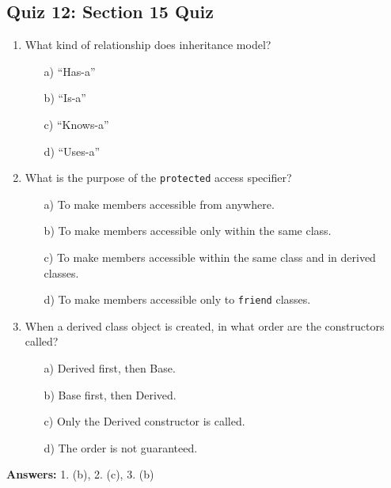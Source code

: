 \subsection{Quiz 12: Section 15 Quiz}
\begin{enumerate}
	\item What kind of relationship does inheritance model?
	\begin{enumerate}
		\item[a)] ``Has-a''
		\item[b)] ``Is-a''
		\item[c)] ``Knows-a''
		\item[d)] ``Uses-a''
	\end{enumerate}

	\item What is the purpose of the \texttt{protected} access specifier?
	\begin{enumerate}
		\item[a)] To make members accessible from anywhere.
		\item[b)] To make members accessible only within the same class.
		\item[c)] To make members accessible within the same class and in derived classes.
		\item[d)] To make members accessible only to \texttt{friend} classes.
	\end{enumerate}

	\item When a derived class object is created, in what order are the constructors called?
	\begin{enumerate}
		\item[a)] Derived first, then Base.
		\item[b)] Base first, then Derived.
		\item[c)] Only the Derived constructor is called.
		\item[d)] The order is not guaranteed.
	\end{enumerate}
\end{enumerate}

\textbf{Answers:} 1. (b), 2. (c), 3. (b)
